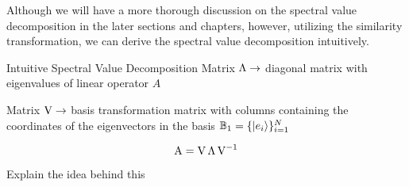 Although we will have a more thorough discussion on the spectral value decomposition in the later sections and chapters, however, utilizing the similarity transformation, we can derive the spectral value decomposition intuitively.

\begin{example}{Intuitive Spectral Value Decomposition}
	Matrix $ \operatorname{\Lambda} \rightarrow $ diagonal matrix with eigenvalues of linear operator $ A $
	
	Matrix $ \operatorname{V} \rightarrow $ basis transformation matrix with columns containing the coordinates of the eigenvectors in the basis $ \mathbb{B}_{1} = \{ \ket{{e}_{i}} \}_{i=1}^{N} $
	
	\[ \operatorname{A} = \operatorname{V} \operatorname{\Lambda} \operatorname{V}^{-1} \]
	
	Explain the idea behind this
\end{example}








